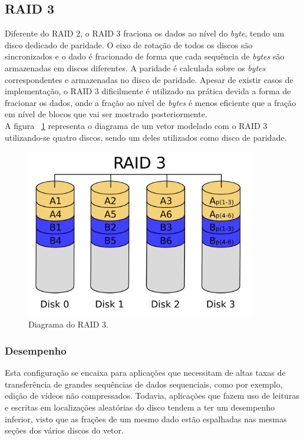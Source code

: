 	
		\subsection{RAID 3}
		
		Diferente do RAID 2, o RAID 3 fraciona os dados ao nível do \textit{byte}, tendo um disco dedicado de paridade. O eixo de rotação de todos os discos são sincronizados e o dado é fracionado de forma que cada sequência de \textit{bytes} são armazenadas em discos diferentes. A paridade é calculada sobre os \textit{bytes} correspondentes e armazenadas no disco de paridade. Apesar de existir casos de implementação, o RAID 3 dificilmente é utilizado na prática devida a forma de 
		fracionar os dados, onde a fração ao nível de \textit{bytes} é menos eficiente que a fração em nível de blocos que vai ser mostrado posteriormente.\\
		
		A figura ~\ref{fig:raid3} representa o diagrama de um vetor modelado com o RAID 3 utilizando-se quatro discos, sendo um deles utilizados como disco de paridade.\\
		
		\begin{figure}[htb]
			\begin{center}
				
				\includegraphics[clip,width=10.0cm]{images/RAID_3.png}
				\caption{Diagrama do RAID 3. }
				\label{fig:raid3}
			\end{center}
		\end{figure} 
		
		\subsubsection{Desempenho}
		Esta configuração se encaixa para aplicações que necessitam de altas taxas de transferência de grandes sequências de dados sequenciais, como por exemplo, edição de vídeos não compressados. Todavia, aplicações que fazem uso de leituras e escritas em localizações aleatórias do disco tendem a ter um desempenho inferior, visto que as frações de um mesmo dado estão espalhadas nas mesmas seções dos vários discos do vetor.\\
		
